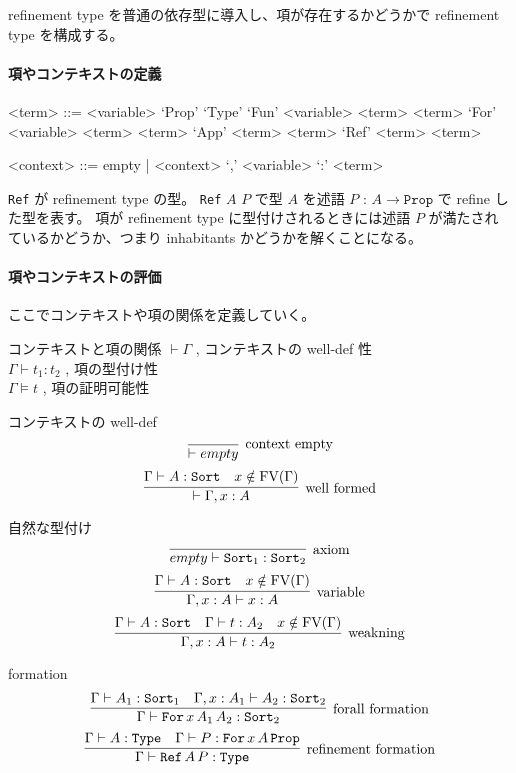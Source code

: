 refinement type を普通の依存型に導入し、項が存在するかどうかで refinement type を構成する。 

\paragraph*{項やコンテキストの定義}
\begin{grammar}
<term> ::= <variable> 
\alt `Prop'
\alt `Type'
\alt `Fun' <variable> <term> <term>
\alt `For' <variable> <term> <term>
\alt `App' <term> <term>
\alt `Ref' <term> <term>

<context> ::= empty | <context> `,' <variable> `:' <term>
\end{grammar}

\texttt{Ref} が refinement type の型。
\texttt{Ref} \(A\) \(P\) で型 \(A\) を述語 \(P\) : \(A \to \texttt{Prop}\) で refine した型を表す。
項が refinement type に型付けされるときには述語 \(P\) が満たされているかどうか、つまり inhabitants かどうかを解くことになる。

\paragraph*{項やコンテキストの評価}
ここでコンテキストや項の関係を定義していく。

\begin{itembox}[l]{コンテキストと項の関係}
  \(\vdash \Gamma\) , コンテキストの well-def 性 \\
  \(\Gamma \vdash t_1 : t_2\) , 項の型付け性 \\
  \(\Gamma \vDash t\) , 項の証明可能性
\end{itembox}

\begin{itembox}[l]{コンテキストの well-def}
  \[\infer[\text{context empty}]{\vdash empty}{}\]
  \[\infer[\text{well formed}]{\vdash \Gamma , x : A}{\Gamma \vdash A : \texttt{Sort} & x \notin \text{FV}(\Gamma)}\]
\end{itembox}

\begin{itembox}[l]{自然な型付け}
  \[\infer[\text{axiom}]{empty \vdash \texttt{Sort}_1 : \texttt{Sort}_2}{}\]
  \[\infer[\text{variable}]{\Gamma , x : A \vdash x : A}{\Gamma \vdash A : \texttt{Sort} & x \notin \text{FV}(\Gamma)}\]
  \[\infer[\text{weakning}]{\Gamma , x : A \vdash t : A_2}{\Gamma \vdash A : \texttt{Sort} & \Gamma \vdash t : A_2 & x \notin \text{FV}(\Gamma)} \]
\end{itembox}

\begin{itembox}[l]{formation}
  \[\infer[\text{forall formation}]{\Gamma \vdash \texttt{For} \, x \, A_1 \, A_2 : \texttt{Sort}_2}{\Gamma \vdash A_1 : \texttt{Sort}_1 & \Gamma , x : A_1 \vdash A_2 : \texttt{Sort}_2 }\]
  \[\infer[\text{refinement formation}]{\Gamma \vdash \texttt{Ref} \, A \, P : \texttt{Type}}{\Gamma \vdash A : \texttt{Type} & \Gamma \vdash P : \texttt{For} \, x \, A \, \texttt{Prop}}\]
\end{itembox}

